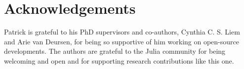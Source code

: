 \documentclass[
  letterpaper,
  DIV=11,
  numbers=noendperiod]{scrartcl}
\begin{document}
\hypertarget{sec-ack}{%
\section{Acknowledgements}\label{sec-ack}}

Patrick is grateful to his PhD supervisors and co-authors, Cynthia C. S.
Liem and Arie van Deursen, for being so supportive of him working on
open-source developments. The authors are grateful to the Julia
community for being welcoming and open and for supporting research
contributions like this one.
\end{document}
